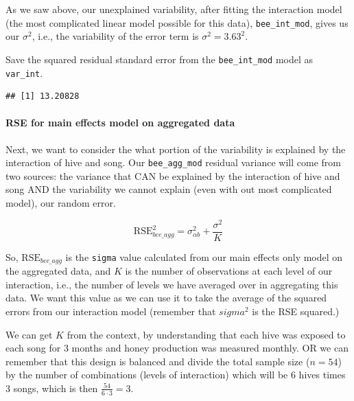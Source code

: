 \documentclass[
  openany]{book}
\newenvironment{Shaded}{\begin{snugshade}}{\end{snugshade}}
\newcommand{\DecValTok}[1]{\textcolor[rgb]{0.00,0.00,0.81}{#1}}
\newcommand{\FunctionTok}[1]{\textcolor[rgb]{0.00,0.00,0.00}{#1}}
\newcommand{\NormalTok}[1]{#1}
\newcommand{\OtherTok}[1]{\textcolor[rgb]{0.56,0.35,0.01}{#1}}
\newcommand{\SpecialCharTok}[1]{\textcolor[rgb]{0.00,0.00,0.00}{#1}}
\begin{document}
As we saw above, our unexplained variability, after fitting the interaction model (the most complicated linear model possible for this data), \texttt{bee\_int\_mod}, gives us our \(\sigma^2\), i.e., the variability of the error term is \(\sigma^2 = 3.63^2\).

Save the squared residual standard error from the \texttt{bee\_int\_mod} model as \texttt{var\_int}.

\begin{Shaded}
\end{Shaded}

\begin{verbatim}
## [1] 13.20828
\end{verbatim}

\hypertarget{rse-for-main-effects-model-on-aggregated-data}{%
\paragraph{RSE for main effects model on aggregated data}\label{rse-for-main-effects-model-on-aggregated-data}}

Next, we want to consider the what portion of the variability is explained by the interaction of hive and song. Our \texttt{bee\_agg\_mod} residual variance will come from two sources: the variance that CAN be explained by the interaction of hive and song AND the variability we cannot explain (even with out most complicated model), our random error.

\[\text{RSE}_{bee\_agg}^2 = \sigma_{\alpha b}^2 + \frac{\sigma^2}{K} \]

So, \(\text{RSE}_{bee\_agg}\) is the \texttt{sigma} value calculated from our main effects only model on the aggregated data, and \(K\) is the number of observations at each level of our interaction, i.e., the number of levels we have averaged over in aggregating this data. We want this value as we can use it to take the average of the squared errors from our interaction model (remember that \(sigma^2\) is the RSE squared.)

We can get \(K\) from the context, by understanding that each hive was exposed to each song for 3 months and honey production was measured monthly. OR we can remember that this design is balanced and divide the total sample size (\(n = 54\)) by the number of combinations (levels of interaction) which will be 6 hives times 3 songs, which is then \(\frac{54}{6\cdot 3} = 3\).
\end{document}
